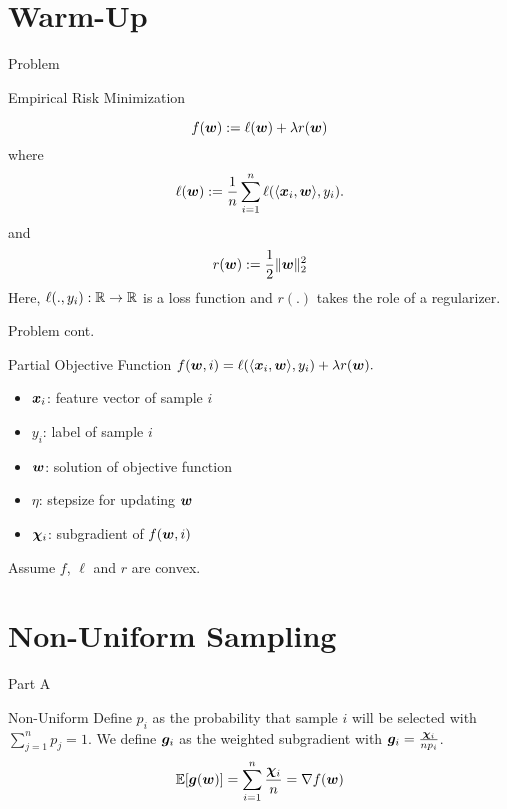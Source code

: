 \section{Warm-Up}
\begin{frame}{Problem}
\begin{block}{Empirical Risk Minimization}
\end{block}
\begin{equation}
    \label{eq:primalObjective}
    f(\bm{w}):= \ell(\bm{w})+\lambda r(\bm{w})
\end{equation}
where 
\begin{equation*}\label{eq:someEquationName}
    \ell(\bm{w}) := \frac1n \sum_{i=1}^n \ell(\langle \bm{x}_i, \bm{w} \rangle, y_i).
\end{equation*}
and 
\begin{equation*}
    r(\bm{w}) := \frac12 \|\bm{w}\|_2^2
\end{equation*}
Here, $\ell(.,y_i):\mathbb{R}\rightarrow\mathbb{R}$ is a loss function and $r(.)$ takes the role of a regularizer. 
\end{frame}

\begin{frame}{Problem cont.}
\begin{block}{Partial Objective Function}
$f(\bm{w}, i) = \ell(\langle \bm{x}_i, \bm{w}\rangle, y_i) + \lambda r(\bm{w}).$
\end{block}
\begin{itemize}
\item $\bm{x}_i$: feature vector of sample $i$
\item $y_i$: label of sample $i$
\item $\bm{w}$: solution of objective function
\item $\eta$: stepsize for updating $\bm{w}$
\item {\color{red}$\bm{\chi}_i$: subgradient of $f(\bm{w}, i)$}
\end{itemize}
Assume $f$, $\ell$ and $r$ are convex.
\end{frame}

\section{Non-Uniform Sampling}
\begin{frame}{Part A}
\Large \center{\color{blue}{ Non-Uniform Sampling Algorithms}}
\end{frame}

\begin{frame}{Non-Uniform}
Define $p_i$ as the probability that sample $i$ will be selected with $\sum_{j=1}^n p_j=1$. We define {\color{red} $\bm{g}_i$ as the weighted subgradient with $\bm{g}_i = \frac{\bm{\chi}_i}{n p_i}$.}
\[
\mathbb{E}[\bm{g}(\bm{w})] = \sum_{i=1}^n \frac{\bm{\chi}_i}{n} = \nabla f(\bm{w})
\]
\end{frame}

